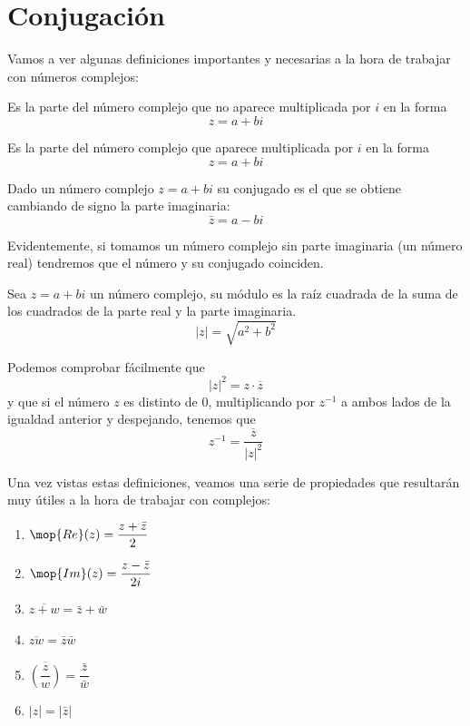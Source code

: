 \documentclass{apuntes}
\begin{document}
\section{Conjugación}
Vamos a ver algunas definiciones importantes y necesarias a la hora de trabajar con números complejos:

\begin{defn}
Es la parte del número complejo que no aparece multiplicada por $i$ en la forma
\[z = a + bi\]
\end{defn}

\begin{defn}
Es la parte del número complejo que aparece multiplicada por $i$ en la forma
\[z = a + bi\]
\end{defn}

\begin{defn}[Conjugado]
Dado un número complejo $z=a+bi$ su conjugado es el que se obtiene cambiando de signo la parte imaginaria:
\[\bar{z}=a-bi\]

Evidentemente, si tomamos un número complejo sin parte imaginaria (un número real) tendremos que el número y su conjugado coinciden.
\end{defn}

\begin{defn}[Módulo]
Sea $z=a+bi$ un número complejo, su módulo es la raíz cuadrada de la suma de los cuadrados de la parte real y la parte imaginaria.
\[|z|=\sqrt{a^2+b^2}\]

Podemos comprobar fácilmente que
\[|z|^2=z \cdot \overline{z}\]
y que si el número $z$ es distinto de 0, multiplicando por $z^{-1}$ a ambos lados de la igualdad anterior y despejando, tenemos que
\[z^{-1}=\frac{\overline{z}}{|z|^2}\]
\end{defn}

Una vez vistas estas definiciones, veamos una serie de propiedades que resultarán muy útiles a la hora de trabajar con complejos:
\begin{enumerate}
\item $\mop{Re}(z)=\dfrac{z+\bar{z}}{2}$
\item $\mop{Im}(z)=\dfrac{z-\bar{z}}{2i}$
\item $\overline{z+w}=\bar{z}+\bar{w}$
\item $\overline{zw}=\bar{z}\bar{w}$
\item $\overline{\left(\dfrac{z}{w}\right)}=\dfrac{\bar{z}}{\bar{w}}$
\item $|z|=|\bar{z}|$
\end{enumerate}
\end{document}
